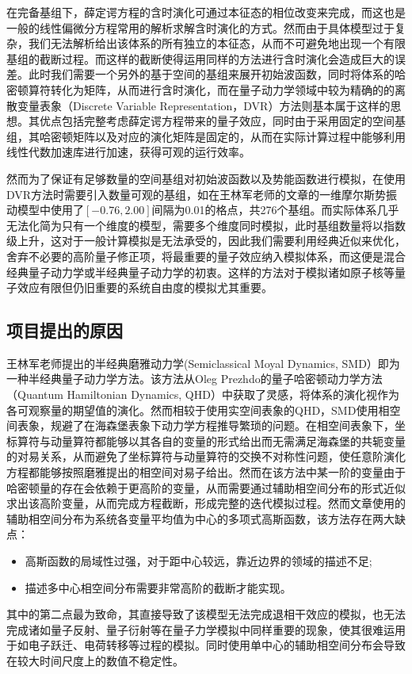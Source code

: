 在完备基组下，薛定谔方程的含时演化可通过本征态的相位改变来完成，而这也是一般的线性偏微分方程常用的解析求解含时演化的方式。然而由于具体模型过于复杂，我们无法解析给出该体系的所有独立的本征态，从而不可避免地出现一个有限基组的截断过程。而这样的截断使得运用同样的方法进行含时演化会造成巨大的误差。此时我们需要一个另外的基于空间的基组来展开初始波函数，同时将体系的哈密顿算符转化为矩阵，从而进行含时演化，而在量子动力学领域中较为精确的的离散变量表象（Discrete Variable Representation，DVR）方法则基本属于这样的思想\cite{colbert1992novel}。其优点包括完整考虑薛定谔方程带来的量子效应，同时由于采用固定的空间基组，其哈密顿矩阵以及对应的演化矩阵是固定的，从而在实际计算过程中能够利用线性代数加速库进行加速，获得可观的运行效率。

然而为了保证有足够数量的空间基组对初始波函数以及势能函数进行模拟，在使用DVR方法时需要引入数量可观的基组，如在王林军老师的文章\cite{LinjunSemiclassical}的一维摩尔斯势振动模型中使用了$[-0.76,2.00]$间隔为0.01的格点，共276个基组。而实际体系几乎无法化简为只有一个维度的模型，需要多个维度同时模拟，此时基组数量将以指数级上升，这对于一般计算模拟是无法承受的，因此我们需要利用经典近似来优化，舍弃不必要的高阶量子修正项，将最重要的量子效应纳入模拟体系，而这便是混合经典量子动力学或半经典量子动力学的初衷。这样的方法对于模拟诸如原子核等量子效应有限但仍旧重要的系统自由度的模拟尤其重要。

\subsection{项目提出的原因}
王林军老师提出的半经典磨雅动力学(Semiclassical Moyal Dynamics, SMD）即为一种半经典量子动力学方法\cite{LinjunSemiclassical}。该方法从Oleg Prezhdo的量子哈密顿动力学方法\cite{OlegQHD}（Quantum Hamiltonian Dynamics, QHD）中获取了灵感，将体系的演化视作为各可观察量的期望值的演化。然而相较于使用实空间表象的QHD，SMD使用相空间表象，规避了在海森堡表象下动力学方程推导繁琐的问题。在相空间表象下，坐标算符与动量算符都能够以其各自的变量的形式给出而无需满足海森堡的共轭变量的对易关系\cite{wigner1997quantum}，从而避免了坐标算符与动量算符的交换不对称性问题，使任意阶演化方程都能够按照磨雅提出的相空间对易子\cite{moyal1949quantum}给出。然而在该方法中某一阶的变量由于哈密顿量的存在会依赖于更高阶的变量，从而需要通过辅助相空间分布的形式近似求出该高阶变量，从而完成方程截断，形成完整的迭代模拟过程。然而文章使用的辅助相空间分布为系统各变量平均值为中心的多项式高斯函数，该方法存在两大缺点：
\begin{itemize}
	\item 高斯函数的局域性过强，对于距中心较远，靠近边界的领域的描述不足;
	\item 描述多中心相空间分布需要非常高阶的截断才能实现。
\end{itemize}
其中的第二点最为致命，其直接导致了该模型无法完成退相干效应的模拟，也无法完成诸如量子反射、量子衍射等在量子力学模拟中同样重要的现象\cite{YifanShenPSQHD}，使其很难运用于如电子跃迁、电荷转移等过程的模拟。同时使用单中心的辅助相空间分布会导致在较大时间尺度上的数值不稳定性\cite{kaiguPSQHD}。

